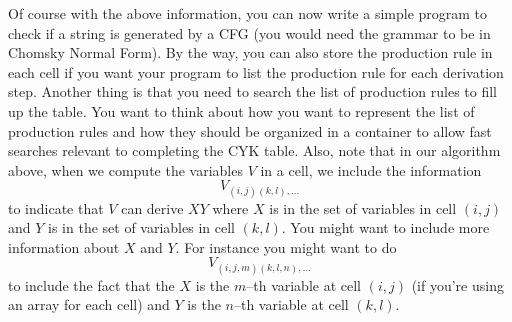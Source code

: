 Of course with the above information, you can now
write a simple program to check if a string is generated by a CFG (you
would need the grammar to be in Chomsky Normal Form).
By the way, you can also store the production rule in each cell if you
want your program to list the production rule for each derivation
step. Another thing is that you need to search the list of production 
rules to fill up the table.
You want to think about how you want to represent the list of
production rules and how they should be
organized in a container to allow fast searches relevant to
completing the CYK table.
Also, note that in our algorithm above, when we compute
the variables $V$ in a cell, we include the information
\[
  V_{(i,j)(k,l), ...}
\]
to indicate that $V$ can derive $XY$ where $X$ is in the
set of variables in cell $(i,j)$ and $Y$ is in the set of variables
in cell $(k,l)$.
You might want to include more information about $X$ and $Y$.
For instance you might want to
do
\[
  V_{(i,j,m)(k,l,n), ...}
\]
to include the fact that the $X$ is the $m$--th variable at cell $(i,j)$
(if you're using an array for each cell)
and $Y$ is the $n$--th variable at cell $(k,l)$.
